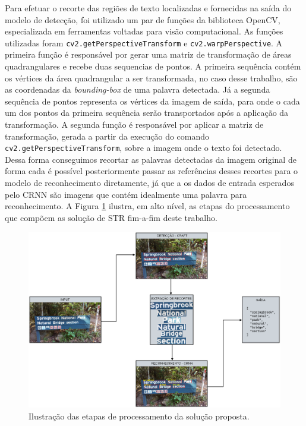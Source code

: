Para efetuar o recorte das regiões de texto localizadas e fornecidas na saída do modelo de detecção, foi utilizado um par de funções da biblioteca OpenCV, especializada em ferramentas voltadas para visão computacional. As funções utilizadas foram \texttt{cv2.getPerspectiveTransform} e \texttt{cv2.warpPerspective}.
A primeira função é responsável por gerar uma matriz de transformação de áreas quadrangulares e recebe duas sequencias de pontos. A primeira sequência contém os vértices da área quadrangular a ser transformada, no caso desse trabalho, são as coordenadas da \textit{bounding-box} de uma palavra detectada. Já a segunda sequência de pontos representa os vértices da imagem de saída, para onde o cada um dos pontos da primeira sequência serão transportados após a aplicação da transformação.
A segunda função é responsável por aplicar a matriz de transformação, gerada a partir da execução do comando \texttt{cv2.getPerspectiveTransform}, sobre a imagem onde o texto foi detectado. Dessa forma conseguimos recortar as palavras detectadas da imagem original de forma cada é possível posteriormente passar as referências desses recortes para o modelo de reconhecimento diretamente, já que a os dados de entrada esperados pelo CRNN são imagens que contém idealmente uma palavra para reconhecimento. A Figura \ref{fig:methodology_pipeline} ilustra, em alto nível, as etapas do processamento que compõem as solução de STR fim-a-fim deste trabalho.

\begin{figure}
    \centering
    \includegraphics[width=\textwidth]{figs/metodologia-pipeline.png}
    \caption{Ilustração das etapas de processamento da solução proposta.}
    \label{fig:methodology_pipeline}
\end{figure}

